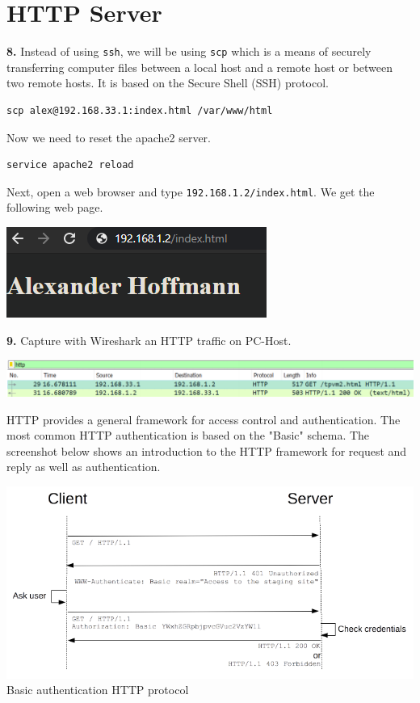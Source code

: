 \documentclass[12pt]{extarticle}
\begin{document}
\section{HTTP Server}
\textbf{8.} Instead of using \texttt{ssh}, we will be using \texttt{scp} which is a means of securely transferring computer files between a local host and a remote host or between two remote hosts. It is based on the Secure Shell (SSH) protocol.
\begin{verbatim}
scp alex@192.168.33.1:index.html /var/www/html
\end{verbatim}
Now we need to reset the apache2 server.
\begin{verbatim}
service apache2 reload
\end{verbatim}
Next, open a web browser and type \texttt{192.168.1.2/index.html}. We get the following web page.
\begin{center}
\includegraphics[scale=0.8]{resources/4-1-1.png}
\end{center}

\textbf{9.} Capture with Wireshark an HTTP traffic on PC-Host.
\begin{center}
\includegraphics[scale=0.5]{resources/4-2-1.png}
\end{center}
HTTP provides a general framework for access control and authentication. The most common HTTP authentication is based on the "Basic" schema. The screenshot below shows an introduction to the HTTP framework for request and reply as well as authentication.
\begin{center}
\includegraphics[scale=0.8]{resources/4-2-2.png}\\
Basic authentication HTTP protocol
\end{center}
\end{document}
